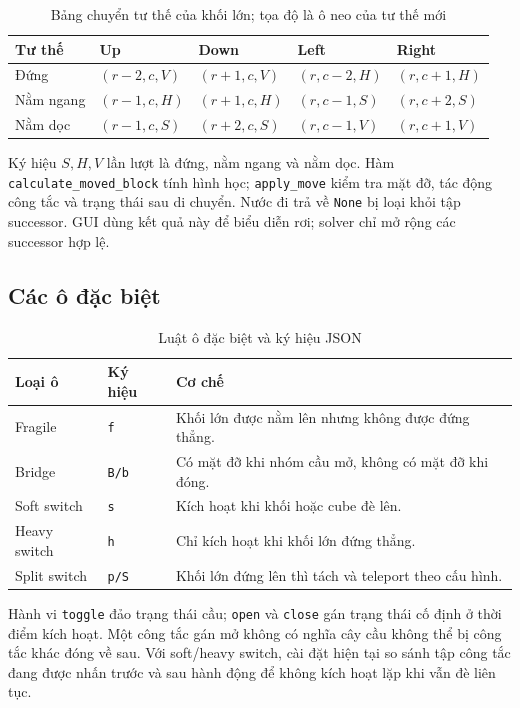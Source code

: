 \begin{table}[htbp]\centering\small
\caption{Bảng chuyển tư thế của khối lớn; tọa độ là ô neo của tư thế mới}
\begin{tabular}{|l|l|l|l|l|}
\hline Tư thế & Up & Down & Left & Right\\\hline
Đứng & $(r-2,c,V)$ & $(r+1,c,V)$ & $(r,c-2,H)$ & $(r,c+1,H)$\\\hline
Nằm ngang & $(r-1,c,H)$ & $(r+1,c,H)$ & $(r,c-1,S)$ & $(r,c+2,S)$\\\hline
Nằm dọc & $(r-1,c,S)$ & $(r+2,c,S)$ & $(r,c-1,V)$ & $(r,c+1,V)$\\\hline
\end{tabular}
\end{table}
Ký hiệu $S,H,V$ lần lượt là đứng, nằm ngang và nằm dọc. Hàm \texttt{calculate\_moved\_block} tính hình học; \texttt{apply\_move} kiểm tra mặt đỡ, tác động công tắc và trạng thái sau di chuyển. Nước đi trả về \texttt{None} bị loại khỏi tập successor. GUI dùng kết quả này để biểu diễn rơi; solver chỉ mở rộng các successor hợp lệ.

\subsection{Các ô đặc biệt}
\begin{table}[htbp]\centering\small
\caption{Luật ô đặc biệt và ký hiệu JSON}
\begin{tabularx}{\linewidth}{|l|p{.12\linewidth}|Y|}
\hline Loại ô & Ký hiệu & Cơ chế\\\hline
Fragile & \texttt{f} & Khối lớn được nằm lên nhưng không được đứng thẳng.\\\hline
Bridge & \texttt{B/b} & Có mặt đỡ khi nhóm cầu mở, không có mặt đỡ khi đóng.\\\hline
Soft switch & \texttt{s} & Kích hoạt khi khối hoặc cube đè lên.\\\hline
Heavy switch & \texttt{h} & Chỉ kích hoạt khi khối lớn đứng thẳng.\\\hline
Split switch & \texttt{p/S} & Khối lớn đứng lên thì tách và teleport theo cấu hình.\\\hline
\end{tabularx}
\end{table}
Hành vi \texttt{toggle} đảo trạng thái cầu; \texttt{open} và \texttt{close} gán trạng thái cố định ở thời điểm kích hoạt. Một công tắc gán mở không có nghĩa cây cầu không thể bị công tắc khác đóng về sau. Với soft/heavy switch, cài đặt hiện tại so sánh tập công tắc đang được nhấn trước và sau hành động để không kích hoạt lặp khi vẫn đè liên tục.

